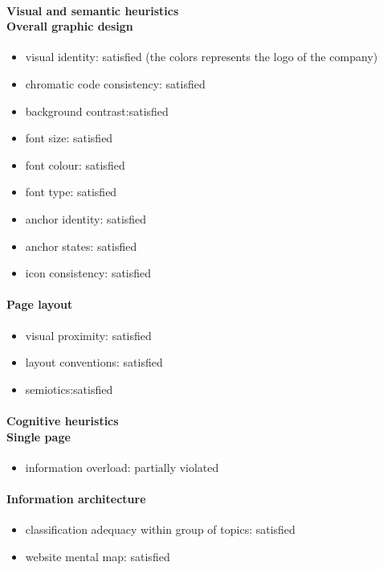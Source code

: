 \begin{enumerate}
	\paragraph*{Visual and semantic heuristics \\ Overall graphic design }
	\begin{itemize}
		\item visual identity: satisfied (the colors represents the logo of the company)
		\item chromatic code consistency: satisfied
		\item background contrast:satisfied
		\item font size: satisfied
		\item font colour: satisfied
		\item font type: satisfied
		\item anchor identity: satisfied
		\item anchor states: satisfied
		\item icon consistency: satisfied
	\end{itemize}
	
	\paragraph*{Page layout}
	\begin{itemize}
		\item visual proximity: satisfied
		\item layout conventions: satisfied
		\item semiotics:satisfied
	\end{itemize}	
	
	\paragraph*{Cognitive heuristics \\ Single page}
	\begin{itemize}
		\item information overload: partially violated
	\end{itemize}	
	
	\paragraph*{Information architecture}
	\begin{itemize}
		\item classification adequacy within group of topics: satisfied
		\item website mental map: satisfied
	\end{itemize}


\end{enumerate}
